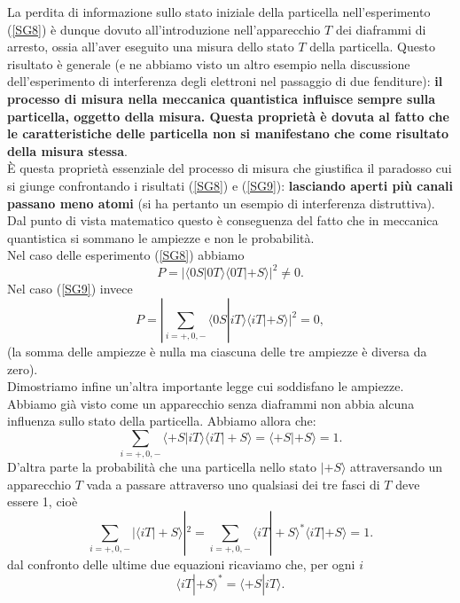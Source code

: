 La perdita di informazione sullo stato iniziale della particella nell'esperimento (\ref{SG8}) è dunque dovuto all'introduzione nell'apparecchio $T$ dei diaframmi di arresto, ossia all'aver eseguito una misura dello stato $T$ della particella. Questo risultato è generale (e ne abbiamo visto un altro esempio nella discussione dell'esperimento di interferenza degli elettroni nel passaggio di due fenditure): \textbf{il processo di misura nella meccanica quantistica influisce sempre sulla particella, oggetto della misura. Questa proprietà è dovuta al fatto che le caratteristiche delle particella non si manifestano che come risultato della misura stessa}.\\
È questa proprietà essenziale del processo di misura che giustifica il paradosso cui si giunge confrontando i risultati (\ref{SG8}) e (\ref{SG9}): \textbf{lasciando aperti più canali passano meno atomi} (si ha pertanto un esempio di interferenza distruttiva). Dal punto di vista matematico questo è conseguenza del fatto che in meccanica quantistica si sommano le ampiezze e non le probabilità.\\
Nel caso delle esperimento (\ref{SG8}) abbiamo
	\begin{equation}
		P= | \langle 0S | 0T \rangle \langle 0T | +S \rangle  |^2 \neq 0 .
	\end{equation}
Nel caso (\ref{SG9}) invece
	\begin{equation}
		P= |\sum \limits_{i=+,0,-}\langle 0S | iT \rangle \langle iT | +S \rangle |^2 =0 ,
	\end{equation}
(la somma delle ampiezze è nulla ma ciascuna delle tre ampiezze è diversa da zero).\\

Dimostriamo infine un'altra importante legge cui soddisfano le ampiezze. Abbiamo già visto come un apparecchio senza diaframmi non abbia alcuna influenza sullo stato della particella. Abbiamo allora che:
	\begin{equation}
	\sum \limits_{i=+,0,-}\langle +S | iT \rangle \langle iT | +S \rangle = \langle +S | +S \rangle =1 .
	\end{equation}
D'altra parte la probabilità che una particella nello stato $| +S \rangle$ attraversando un apparecchio $T$ vada a passare attraverso uno qualsiasi dei tre fasci di $T$ deve essere 1, cioè
	\begin{equation}
		\sum \limits_{i=+,0,-}|\langle iT | +S \rangle|^2= \sum \limits_{i=+,0,-} \langle iT | +S \rangle ^* \langle iT | +S \rangle= 1 .
	\end{equation}
dal confronto delle ultime due equazioni ricaviamo che, per ogni $i$
	\begin{equation}
 		\boxed{
 			\langle iT | +S \rangle ^* = \langle +S | iT \rangle .
 			}
	\label{cap3_3}
	\end{equation}

